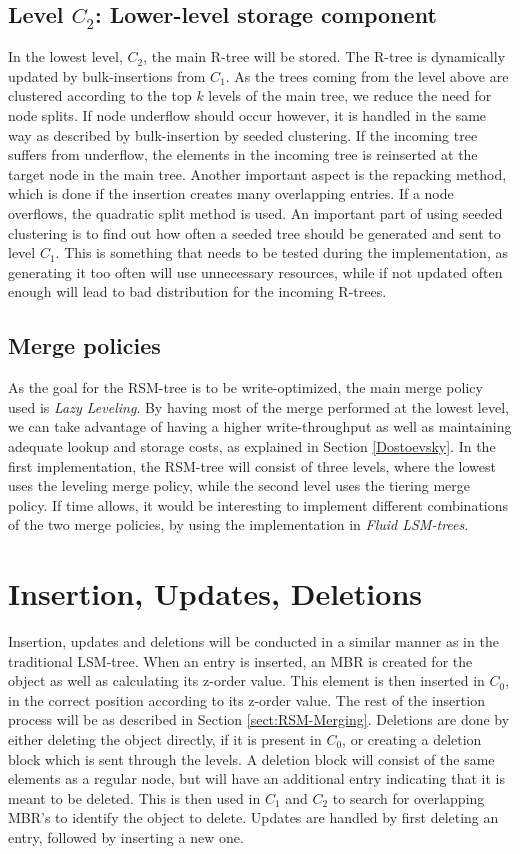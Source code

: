 \subsection{Level $C_2$: Lower-level storage component}
In the lowest level, $C_2$, the main R-tree will be stored. The R-tree is dynamically updated by bulk-insertions from $C_1$. As the trees coming from the level above are clustered according to the top $k$ levels of the main tree, we reduce the need for node splits. If node underflow should occur however, it is handled in the same way as described by bulk-insertion by seeded clustering\cite{SeededClustering}. If the incoming tree suffers from underflow, the elements in the incoming tree is reinserted at the target node in the main tree. Another important aspect is the repacking method, which is done if the insertion creates many overlapping entries. If a node overflows, the quadratic split method\cite{r-tree} is used. An important part of using seeded clustering is to find out how often a seeded tree should be generated and sent to level $C_1$. This is something that needs to be tested during the implementation, as generating it too often will use unnecessary resources, while if not updated often enough will lead to bad distribution for the incoming R-trees. 

\subsection{Merge policies}
As the goal for the RSM-tree is to be write-optimized, the main merge policy used is \emph{Lazy Leveling}\cite{Dostoevsky}. By having most of the merge performed at the lowest level, we can take advantage of having a higher write-throughput as well as maintaining adequate lookup and storage costs, as explained in Section \ref{Dostoevsky}. In the first implementation, the RSM-tree will consist of three levels, where the lowest uses the leveling merge policy, while the second level uses the tiering merge policy. If time allows, it would be interesting to implement different combinations of the two merge policies, by using the implementation in \emph{Fluid LSM-trees}.  


\section{Insertion, Updates, Deletions}
Insertion, updates and deletions will be conducted in a similar manner as in the traditional LSM-tree. When an entry is inserted, an MBR is created for the object as well as calculating its z-order value. This element is then inserted in $C_0$, in the correct position according to its z-order value. The rest of the insertion process will be as described in Section \ref{sect:RSM-Merging}. Deletions are done by either deleting the object directly, if it is present in $C_0$, or creating a deletion block which is sent through the levels. A deletion block will consist of the same elements as a regular node, but will have an additional entry indicating that it is meant to be deleted. This is then used in $C_1$ and $C_2$ to search for overlapping MBR's to identify the object to delete. Updates are handled by first deleting an entry, followed by inserting a new one. 


